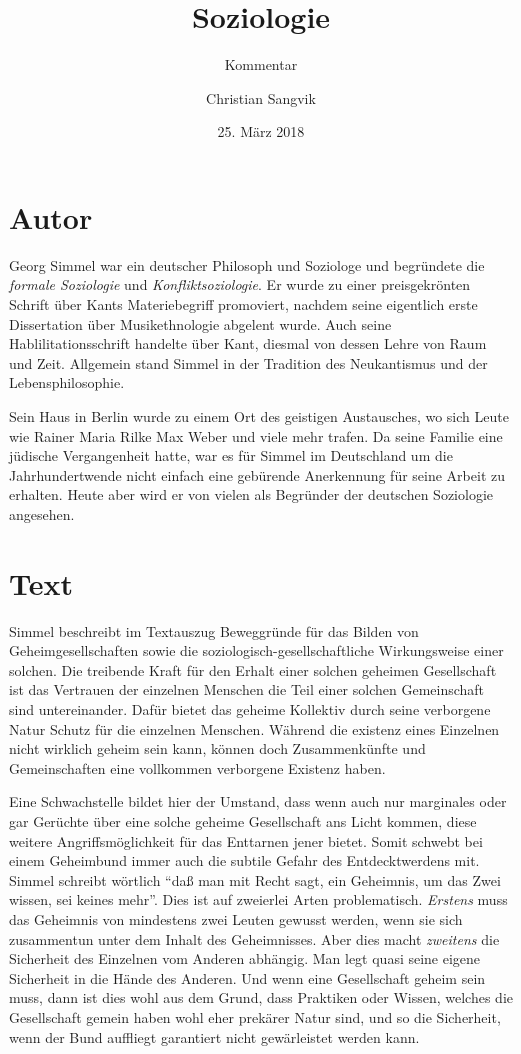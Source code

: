 \documentclass[a4paper,ngerman,11pt]{scrartcl}
\subtitle{Kommentar}
\author{Christian Sangvik}
\date{25. März 2018}
\title{Soziologie}
\begin{document}
\maketitle

\section{Autor}
\label{sec-1}

Georg Simmel war ein deutscher Philosoph und Soziologe und begründete die
\emph{formale Soziologie} und \emph{Konfliktsoziologie}. Er wurde zu einer
preisgekrönten Schrift über Kants Materiebegriff promoviert, nachdem seine
eigentlich erste Dissertation über Musikethnologie abgelent wurde. Auch seine
Hablilitationsschrift handelte über Kant, diesmal von dessen Lehre von Raum
und Zeit. Allgemein stand Simmel in der Tradition des Neukantismus und der
Lebensphilosophie.

Sein Haus in Berlin wurde zu einem Ort des geistigen Austausches, wo sich
Leute wie Rainer Maria Rilke Max Weber und viele mehr trafen. Da seine Familie
eine jüdische Vergangenheit hatte, war es für Simmel im Deutschland um die
Jahrhundertwende nicht einfach eine gebürende Anerkennung für seine Arbeit zu
erhalten. Heute aber wird er von vielen als Begründer der deutschen Soziologie
angesehen.\cite{wiki:Simmel-de}

\section{Text}
\label{sec-2}

Simmel beschreibt im Textauszug Beweggründe für das Bilden von
Geheimgesellschaften sowie die soziologisch-gesellschaftliche Wirkungsweise
einer solchen. Die treibende Kraft für den Erhalt einer solchen geheimen
Gesellschaft ist das Vertrauen der einzelnen Menschen die Teil einer solchen
Gemeinschaft sind untereinander. Dafür bietet das geheime Kollektiv durch
seine verborgene Natur Schutz für die einzelnen Menschen. Während die existenz
eines Einzelnen nicht wirklich geheim sein kann, können doch Zusammenkünfte
und Gemeinschaften eine vollkommen verborgene Existenz haben.\cite{Simmel1992}

Eine Schwachstelle bildet hier der Umstand, dass wenn auch nur marginales oder
gar Gerüchte über eine solche geheime Gesellschaft ans Licht kommen, diese
weitere Angriffsmöglichkeit für das Enttarnen jener bietet. Somit schwebt bei
einem Geheimbund immer auch die subtile Gefahr des Entdecktwerdens mit. Simmel
schreibt wörtlich ``daß man mit Recht sagt, ein Geheimnis, um das Zwei wissen,
sei keines mehr''.\cite{Simmel1992} Dies ist auf zweierlei Arten
problematisch. \emph{Erstens} muss das Geheimnis von mindestens zwei Leuten gewusst
werden, wenn sie sich zusammentun unter dem Inhalt des Geheimnisses. Aber dies
macht \emph{zweitens} die Sicherheit des Einzelnen vom Anderen abhängig. Man legt
quasi seine eigene Sicherheit in die Hände des Anderen. Und wenn eine
Gesellschaft geheim sein muss, dann ist dies wohl aus dem Grund, dass
Praktiken oder Wissen, welches die Gesellschaft gemein haben wohl eher
prekärer Natur sind, und so die Sicherheit, wenn der Bund auffliegt garantiert
nicht gewärleistet werden kann.
\end{document}
